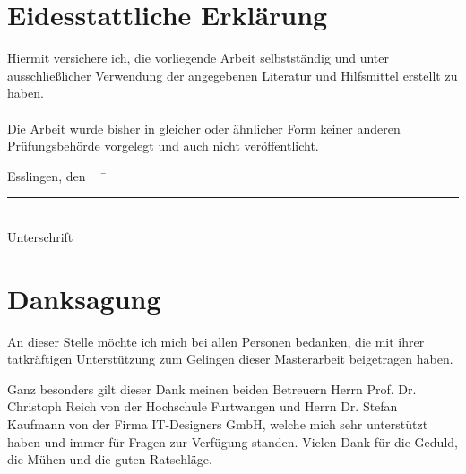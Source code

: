 
\chapter*{Eidesstattliche Erklärung}

Hiermit versichere ich, die vorliegende Arbeit selbstständig und unter ausschließlicher Verwendung der angegebenen Literatur und Hilfsmittel erstellt zu haben.\\\\
Die Arbeit wurde bisher in gleicher oder ähnlicher Form keiner anderen Prüfungsbehörde vorgelegt und auch nicht veröffentlicht.\\
\begin{tabbing}
          Esslingen, den \workDatum ~~	\= \rule{5cm}{0.3mm}\\
                                                                                                    \> Unterschrift
\end{tabbing}
%
\chapter*{Danksagung} %

An dieser Stelle möchte ich mich bei allen Personen bedanken, die mit ihrer tatkräftigen Unterstützung zum
Gelingen dieser Masterarbeit beigetragen haben.

Ganz besonders gilt dieser Dank meinen beiden Betreuern Herrn Prof. Dr. Christoph Reich von
der Hochschule Furtwangen und Herrn Dr. Stefan Kaufmann von der Firma IT-Designers GmbH, welche
mich sehr unterstützt haben und immer für Fragen zur Verfügung standen.
Vielen Dank für die Geduld, die Mühen und die guten Ratschläge.

